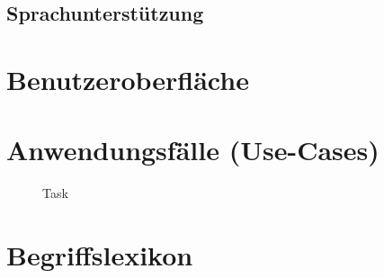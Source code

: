 \documentclass[a4paper,10pt,titlepage]{article}
\newcommand{\usecase}[7]
{\subsection{#1}
\begin{tabular}{|p{0.2\textwidth}|p{0.7\textwidth}|}
\hline
  Ziel & #2\\\hline
  Vorbedingung & #3\\\hline
  Normalablauf & #6\\\hline
  Nachbedingung & #4\\\hline
  Sonderfall & #7\\\hline
  Nachbedingung im Sonderfall& #5\\\hline
 \end{tabular}
}
\newcommand{\begriff}[7]
{\subsection{#1}
\begin{tabular}{|p{0.2\textwidth}|p{0.7\textwidth}|}
\hline
  Bedeutung & #2\\\hline
  Abgrenzung & #3\\\hline
  Gültigkeit & #4\\\hline
  Bezeichnung & #5\\\hline
  Unklarheiten & #6\\\hline
  Querverweise & #7\\\hline
 \end{tabular}}
\begin{document}
\subsection{Sprachunterstützung}

\clearpage
\section{Benutzeroberfläche}


\clearpage
\section{Anwendungsfälle (Use-Cases)}
\begin{figure}[H]
  \centering
  \caption{Task}
\end{figure}



\clearpage
\appendix
\section{Begriffslexikon}

\end{document}

